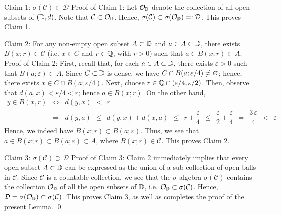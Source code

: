 \vskip 0.5cm
\noindent
Claim 1:\;\; $\sigma(\mathcal{C}) \subset \mathcal{D}$
\vskip 0.1cm
\noindent
Proof of Claim 1:\;
Let $\mathcal{O}_{\mathbb{D}}$ denote the collection of all open subsets of $(\mathbb{D},d)$.
Note that $\mathcal{C} \subset \mathcal{O}_{\mathbb{D}}$.
Hence, $\sigma(\mathcal{C}) \subset \sigma(\mathcal{O}_{\mathbb{D}}) =: \mathcal{D}$.
This proves Claim 1.


\vskip 0.5cm
\noindent
Claim 2:\;\; For any non-empty open subset $A \subset \mathbb{D}$ and $a \in A \subset \mathbb{D}$,
there exists $B(x;r) \in \mathcal{C}$ (i.e. $x \in C$ and $r \in \mathbb{Q}$, with $r > 0$)
such that $a \in B(x;r) \subset A$.
\vskip 0.1cm
\noindent
Proof of Claim 2:\; First, recall that, for each $a \in A \subset \mathbb{D}$,
there exists $\varepsilon > 0$ such that $B(a;\varepsilon) \subset A$.
Since $C \subset \mathbb{D}$ is dense, we have $C \cap B(a;\varepsilon/4) \neq \varnothing$;
hence, there exists $x \in C \cap B(a;\varepsilon/4)$.
Next, choose $r \in \mathbb{Q} \cap (\varepsilon/4,\varepsilon/2)$.
Then, observe that $d(a,x) < \varepsilon/4 < r$; hence $a \in B(x;r)$.
On the other hand,
\begin{eqnarray*}
y \in B(x,r)
& \Longleftrightarrow &
	d(y,x) \;\, < \;\, r
\\
& \Longrightarrow &
	d(y,a)
	\,\;\leq\;\, d(y,x) + d(x,a)
	\,\;\leq\;\, r + \dfrac{\varepsilon}{4}
	\,\;\leq\;\, \dfrac{\varepsilon}{2} + \dfrac{\varepsilon}{4}
	\,\;=\;\, \dfrac{3\,\varepsilon}{4}
	\,\;<\;\, \varepsilon
\end{eqnarray*}
Hence, we indeed have $B(x;r) \subset B(a;\varepsilon)$.
Thus, we see that $a \in B(x;r) \subset B(a;\varepsilon) \subset A$,
where $B(x;r) \in \mathcal{C}$.
This proves Claim 2.

\vskip 0.5cm
\noindent
Claim 3:\;\; $\sigma(\mathcal{C}) \supset \mathcal{D}$
\vskip 0.1cm
\noindent
Proof of Claim 3:\; Claim 2 immediately implies that every open subset $A \subset \mathbb{D}$
can be expressed as the union of a sub-collection of open balls in $\mathcal{C}$.
Since $\mathcal{C}$ is a countable collection, we see that
the $\sigma$-algebra $\sigma(\mathcal{C})$ contains the collection $\mathcal{O}_{\mathbb{D}}$ 
of all the open subsets of $\mathbb{D}$, i.e. $\mathcal{O}_{\mathbb{D}} \subset \sigma(\mathcal{C})$.
Hence, $\mathcal{D} = \sigma(\mathcal{O}_{\mathbb{D}}) \subset \sigma(\mathcal{C})$.
This proves Claim 3, as well as completes the proof of the present Lemma.
\qed


\renewcommand{\theenumi}{\roman{enumi}}
\renewcommand{\labelenumi}{\textnormal{(\theenumi)}$\;\;$}

